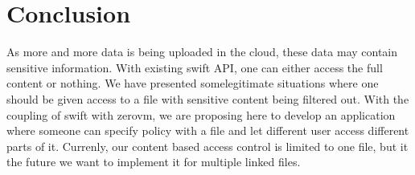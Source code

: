 \section{Conclusion}
As more and more data is being uploaded in the cloud, these data may contain sensitive information. With existing swift API, one can either access the full content or nothing. We have presented somelegitimate situations where one should be given access to a  file with sensitive content being filtered out.  With the coupling of swift with zerovm, we are proposing here to develop an application where someone can specify policy with a file and let different user access different parts of it. Currenly, our content based access control is limited to one file, but it the future we want to implement it for multiple linked files.